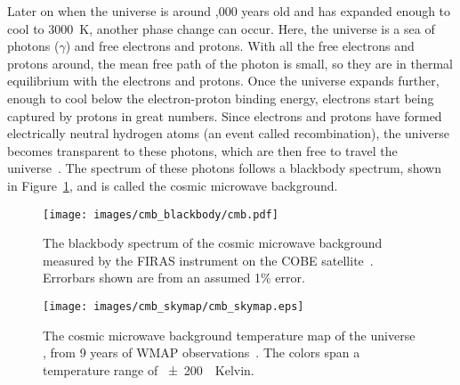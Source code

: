 Later on when the universe is around ,000 years old and has expanded enough to cool to \nicetilde\SI{3000}{K}, another phase change can occur.
Here, the universe is a sea of photons ($\gamma$) and free electrons and protons.
With all the free electrons and protons around, the mean free path of the photon is small, so they are in thermal equilibrium with the electrons and protons.
Once the universe expands further, enough to cool below the electron-proton binding energy, electrons start being captured by protons in great numbers.
Since electrons and protons have formed electrically neutral hydrogen atoms (an event called recombination), the universe becomes transparent to these photons, which are then free to travel the universe~\cite{planck2015,theEarlyUniverse,CMBFundamentals,CMBFlat}.
The spectrum of these photons follows a blackbody spectrum, shown in Figure~\ref{fig:cmb_black}, and is called the cosmic microwave background.

\begin{figure}[t]
  \centering
  \texttt{[image: images/cmb\_blackbody/cmb.pdf]}
  \caption[Cosmic Microwave Background Blackbody]{
    The blackbody spectrum of the cosmic microwave background measured by the FIRAS instrument on the COBE satellite~\cite{mather1990}.
    Errorbars shown are from an assumed 1\% error.
  }
  \label{fig:cmb_black}
\end{figure}


\begin{figure}[t]
  \centering
  \texttt{[image: images/cmb\_skymap/cmb\_skymap.eps]}
  \caption[Cosmic Microwave Background Skymap]{
    The cosmic microwave background temperature map of the universe \cite{wmap_skymap}, from 9 years of WMAP observations~\cite{wmap9year}.
    The colors span a temperature range of \SI{\pm200}{\mu{}Kelvin}.
  }
  \label{fig:cmb}
\end{figure}

